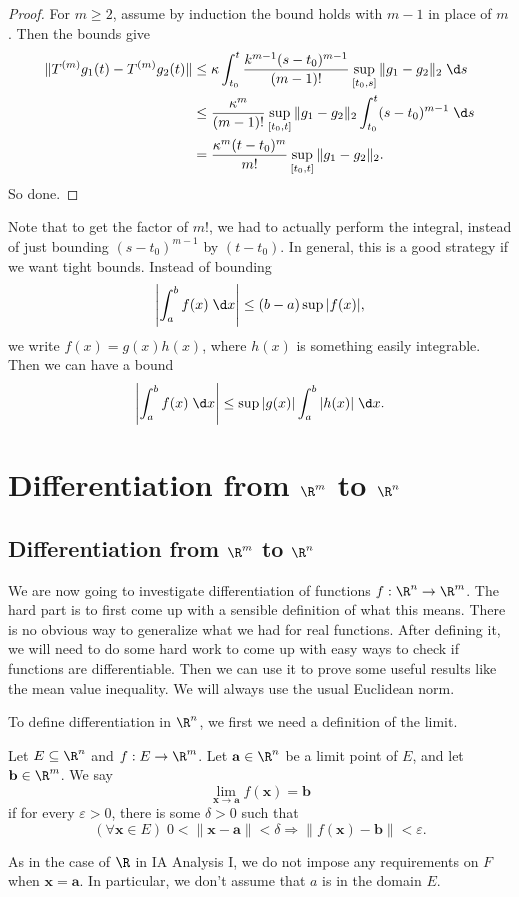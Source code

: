 \documentclass[a4paper]{article}
\begin{document}
\begin{proof}
  For $m \geq 2$, assume by induction the bound holds with $m - 1$ in place of $m$. Then the bounds give
  \begin{align*}
    \| T^{(m)} g_1(t) - T^{(m)} g_2(t)\| &\leq \kappa \int_{t_0}^t \frac{k^{m - 1}(s - t_0)^{m - 1}}{(m - 1)!} \sup_{[t_0, s]} \|g_1 - g_2\|_2 \;\d s\\
    &\leq \frac{\kappa^m}{(m - 1)!} \sup_{[t_0, t]} \|g_1 - g_2\|_2 \int_{t_0}^t (s - t_0)^{m - 1} \;\d s\\
    &= \frac{\kappa^m (t - t_0)^m}{m!} \sup_{[t_0, t]} \|g_1 - g_2\|_2.
  \end{align*}
  So done.
\end{proof}
Note that to get the factor of $m!$, we had to actually perform the integral, instead of just bounding $(s - t_0)^{m -1 }$ by $(t - t_0)$. In general, this is a good strategy if we want tight bounds. Instead of bounding
\[
  \left|\int_a^b f(x) \;\d x\right| \leq (b - a) \sup |f(x)|,
\]
we write $f(x) = g(x) h(x)$, where $h(x)$ is something easily integrable. Then we can have a bound
\[
  \left|\int_a^b f(x) \;\d x\right| \leq \sup |g(x)| \int_a^b |h(x)| \;\d x.
\]

\section{Differentiation from \texorpdfstring{$\R^m$}{Rm} to \texorpdfstring{$\R^n$}{Rn}}
\subsection{Differentiation from \texorpdfstring{$\R^m$}{Rm} to \texorpdfstring{$\R^n$}{Rn}}
We are now going to investigate differentiation of functions $f: \R^n \to \R^m$. The hard part is to first come up with a sensible definition of what this means. There is no obvious way to generalize what we had for real functions. After defining it, we will need to do some hard work to come up with easy ways to check if functions are differentiable. Then we can use it to prove some useful results like the mean value inequality. We will always use the usual Euclidean norm.


To define differentiation in $\R^n$, we first we need a definition of the limit.

\begin{defi}
  Let $E \subseteq \R^n$ and $f: E \to \R^m$. Let $\mathbf{a}\in \R^n$ be a limit point of $E$, and let $\mathbf{b} \in \R^m$. We say
  \[
    \lim_{\mathbf{x} \to \mathbf{a}} f(\mathbf{x}) = \mathbf{b}
  \]
  if for every $\varepsilon > 0$, there is some $\delta > 0$ such that
  \[
    (\forall \mathbf{x} \in E)\; 0 < \|\mathbf{x} - \mathbf{a}\| < \delta \Rightarrow \|f(\mathbf{x}) - \mathbf{b}\| < \varepsilon.
  \]
\end{defi}
As in the case of $\R$ in IA Analysis I, we do not impose any requirements on $F$ when $\mathbf{x} = \mathbf{a}$. In particular, we don't assume that $a$ is in the domain $E$.
\end{document}
